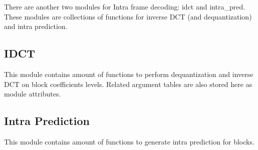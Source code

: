 \documentclass[../main.tex]{subfiles}
\begin{document}
There are another two modules for Intra frame decoding: idct and intra\_pred.
These modules are collections of functions for inverse DCT (and dequantization) and intra prediction.

\subsection{IDCT}
This module contains amount of functions to perform dequantization and inverse DCT on block coefficients levels.
Related argument tables are also stored here as module attributes.

\subsection{Intra Prediction}
This module contains amount of functions to generate intra prediction for blocks.
\end{document}
